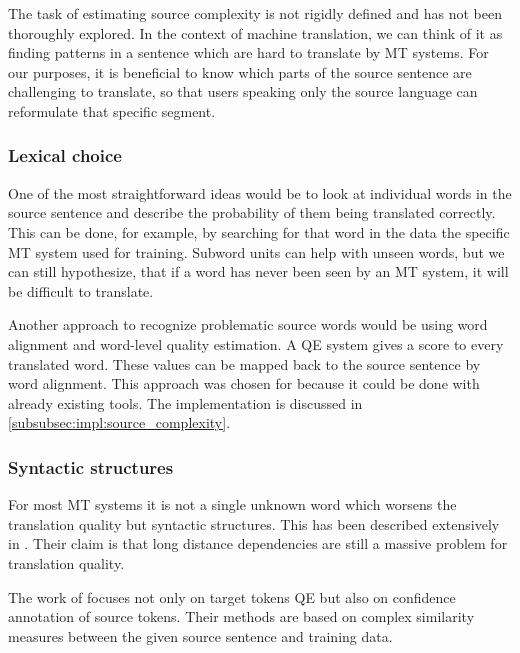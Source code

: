 The task of estimating source complexity is not rigidly defined and has not been thoroughly explored. In the context of machine translation, we can think of it as finding patterns in a sentence which are hard to translate by MT systems. For our purposes, it is beneficial to know which parts of the source sentence are challenging to translate, so that users speaking only the source language can reformulate that specific segment.

\subsubsection{Lexical choice}

One of the most straightforward ideas would be to look at individual words in the source sentence and describe the probability of them being translated correctly. This can be done, for example, by searching for that word in the data the specific MT system used for training. Subword units can help with unseen words, but we can still hypothesize, that if a word has never been seen by an MT system, it will be difficult to translate.

Another approach to recognize problematic source words would be using word alignment and word-level quality estimation. A QE system gives a score to every translated word. These values can be mapped back to the source sentence by word alignment. This approach was chosen for \ptakopet{} because it could be done with already existing tools. The implementation is discussed in \cref{subsubsec:impl:source_complexity}.

\pagebreak
\subsubsection{Syntactic structures}

For most MT systems it is not a single unknown word which worsens the translation quality but syntactic structures. This has been described extensively in \cite{choshen_challenge_sets}. Their claim is that long distance dependencies are still a massive problem for translation quality.

The work of \cite{niehues_confidence} focuses not only on target tokens QE but also on confidence annotation of source tokens. Their methods are based on complex similarity measures between the given source sentence and training data.